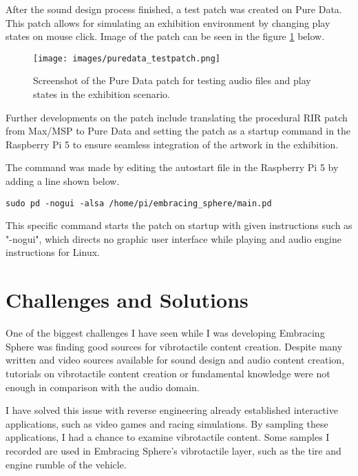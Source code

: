         After the sound design process finished, a test patch was created on Pure Data. This patch allows for simulating an exhibition environment by changing play states on mouse click. Image of the patch can be seen in the figure \ref{fig:PUREDATA} below.\par

        \begin{figure}[H]
            \centering
            \texttt{[image: images/puredata\_testpatch.png]}
            \caption{Screenshot of the Pure Data patch for testing audio files and play states in the exhibition scenario.}
            \label{fig:PUREDATA}
        \end{figure}

        Further developments on the patch include translating the procedural RIR patch from Max/MSP to Pure Data and setting the patch as a startup command in the Raspberry Pi 5 to ensure seamless integration of the artwork in the exhibition.\par

        The command was made by editing the autostart file in the Raspberry Pi 5 by adding a line shown below.\par
                
        \begin{verbatim}
sudo pd -nogui -alsa /home/pi/embracing_sphere/main.pd
        \end{verbatim}
        
        This specific command starts the patch on startup with given instructions such as "-nogui", which directs no graphic user interface while playing and audio engine instructions for Linux.\par
    \section{Challenges and Solutions}
        One of the biggest challenges I have seen while I was developing Embracing Sphere was finding good sources for vibrotactile content creation. Despite many written and video sources available for sound design and audio content creation, tutorials on vibrotactile content creation or fundamental knowledge were not enough in comparison with the audio domain.\par

        I have solved this issue with reverse engineering already established interactive applications, such as video games and racing simulations. By sampling these applications, I had a chance to examine vibrotactile content. Some samples I recorded are used in Embracing Sphere's vibrotactile layer, such as the tire and engine rumble of the vehicle.\par

